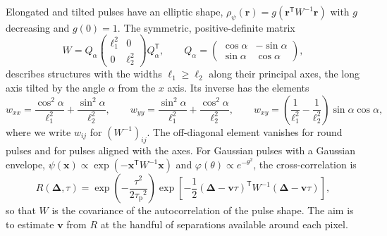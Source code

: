 \documentclass[aps,pre,11pt,a4paper,preprint,amsmath,amssymb,groupedaddress]{revtex4-2}
\newcommand{\br}{\ensuremath{\bm{x}}}
\newcommand{\bv}{\ensuremath{\bm{v}}}
\newcommand{\bD}{\ensuremath{\bm{\Delta}}}
\newcommand{\T}{\ensuremath{\mathsf{T}}}
\newcommand{\rpsi}{\ensuremath{\rho_\psi}}
\newcommand{\taud}{\ensuremath{\tau_\text{p}}}
\newcommand{\Wi}{\ensuremath{W^{-1}}}
\newcommand{\w}[1]{\ensuremath{w_{#1}}}
\newcommand{\psh}{\ensuremath{\psi}}
\newcommand{\tlag}{\tau}
\begin{document}
Elongated and tilted pulses have an elliptic shape, $\rpsi(\bm{r}) = g(\bm{r}^\T \Wi \bm{r})$ with $g$ decreasing and $g(0)=1$. The symmetric, positive-definite matrix
%
\begin{equation}
\label{eq:w}
W = Q_\alpha \begin{pmatrix} \ell_1^2 & 0 \\ 0 & \ell_2^2 \end{pmatrix} Q_\alpha^\T,
\qquad
Q_\alpha = \begin{pmatrix} \cos\alpha & -\sin\alpha \\ \sin\alpha & \cos\alpha \end{pmatrix},
\end{equation}
%
describes structures with the widths $\ell_1 \ge \ell_2$ along their principal axes, the long axis tilted by the angle $\alpha$ from the $x$ axis. Its inverse has the elements
%
\begin{equation}
\label{eq:w_elements}
\w{xx} = \frac{\cos^2\alpha}{\ell_1^2} + \frac{\sin^2\alpha}{\ell_2^2},
\qquad
\w{yy} = \frac{\sin^2\alpha}{\ell_1^2} + \frac{\cos^2\alpha}{\ell_2^2},
\qquad
\w{xy} = \left( \frac{1}{\ell_1^2} - \frac{1}{\ell_2^2} \right) \sin\alpha\cos\alpha,
\end{equation}
%
where we write $\w{ij}$ for $(\Wi)_{ij}$. The off-diagonal element vanishes for round pulses and for pulses aligned with the axes. For Gaussian pulses with a Gaussian envelope, $\psh(\br) \propto \exp(-\br^\T\Wi\br)$ and $\varphi(\theta) \propto e^{-\theta^2}$, the cross-correlation is
%
\begin{equation}
\label{eq:ccf_gauss}
R(\bD, \tlag) = \exp\!\left( - \frac{\tlag^2}{2\taud^2} \right) \exp\!\left[ -\frac{1}{2}(\bD - \bv\tlag)^\T \Wi (\bD - \bv\tlag) \right],
\end{equation}
%
so that $W$ is the covariance of the autocorrelation of the pulse shape. The aim is to estimate \bv{} from $R$ at the handful of separations available around each pixel.
\end{document}
